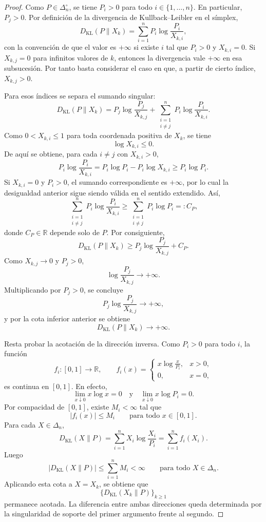 ﻿\documentclass[12pt]{article}
\begin{document}
\begin{proof}
Como \(P\in\Delta_n^\circ\), se tiene \(P_i>0\) para todo \(i\in\{1,\ldots,n\}\). En particular, \(P_j>0\). Por definición de la divergencia de Kullback--Leibler en el símplex,
\[
D_{\mathrm{KL}}(P\|X_k)
=
\sum_{i=1}^n P_i\log\frac{P_i}{X_{k,i}},
\]
con la convención de que el valor es \(+\infty\) si existe \(i\) tal que \(P_i>0\) y \(X_{k,i}=0\). Si \(X_{k,j}=0\) para infinitos valores de \(k\), entonces la divergencia vale \(+\infty\) en esa subsucesión. Por tanto basta considerar el caso en que, a partir de cierto índice, \(X_{k,j}>0\).

Para esos índices se separa el sumando singular:
\[
D_{\mathrm{KL}}(P\|X_k)
=
P_j\log\frac{P_j}{X_{k,j}}
+
\sum_{\substack{i=1\\ i\ne j}}^n
P_i\log\frac{P_i}{X_{k,i}}.
\]
Como \(0<X_{k,i}\le 1\) para toda coordenada positiva de \(X_k\), se tiene
\[
\log X_{k,i}\le 0.
\]
De aquí se obtiene, para cada \(i\ne j\) con \(X_{k,i}>0\),
\[
P_i\log\frac{P_i}{X_{k,i}}
=
P_i\log P_i-P_i\log X_{k,i}
\ge
P_i\log P_i.
\]
Si \(X_{k,i}=0\) y \(P_i>0\), el sumando correspondiente es \(+\infty\), por lo cual la desigualdad anterior sigue siendo válida en el sentido extendido. Así,
\[
\sum_{\substack{i=1\\ i\ne j}}^n
P_i\log\frac{P_i}{X_{k,i}}
\ge
\sum_{\substack{i=1\\ i\ne j}}^n
P_i\log P_i
=:C_P,
\]
donde \(C_P\in\mathbb R\) depende solo de \(P\). Por consiguiente,
\[
D_{\mathrm{KL}}(P\|X_k)
\ge
P_j\log\frac{P_j}{X_{k,j}}+C_P.
\]
Como \(X_{k,j}\to0\) y \(P_j>0\),
\[
\log\frac{P_j}{X_{k,j}}\longrightarrow+\infty.
\]
Multiplicando por \(P_j>0\), se concluye
\[
P_j\log\frac{P_j}{X_{k,j}}\longrightarrow+\infty,
\]
y por la cota inferior anterior se obtiene
\[
D_{\mathrm{KL}}(P\|X_k)\longrightarrow+\infty.
\]

Resta probar la acotación de la dirección inversa. Como \(P_i>0\) para todo \(i\), la función
\[
f_i:[0,1]\longrightarrow\mathbb R,
\qquad
f_i(x)=
\begin{cases}
x\log\frac{x}{P_i}, & x>0,\\
0, & x=0,
\end{cases}
\]
es continua en \([0,1]\). En efecto,
\[
\lim_{x\downarrow0}x\log x=0
\quad\text{y}\quad
\lim_{x\downarrow0}x\log P_i=0.
\]
Por compacidad de \([0,1]\), existe \(M_i<\infty\) tal que
\[
|f_i(x)|\le M_i
\qquad
\text{para todo }x\in[0,1].
\]
Para cada \(X\in\Delta_n\),
\[
D_{\mathrm{KL}}(X\|P)
=
\sum_{i=1}^n
X_i\log\frac{X_i}{P_i}
=
\sum_{i=1}^n f_i(X_i).
\]
Luego
\[
\left|D_{\mathrm{KL}}(X\|P)\right|
\le
\sum_{i=1}^n M_i
<\infty
\qquad
\text{para todo }X\in\Delta_n.
\]
Aplicando esta cota a \(X=X_k\), se obtiene que
\[
\{D_{\mathrm{KL}}(X_k\|P)\}_{k\ge1}
\]
permanece acotada. La diferencia entre ambas direcciones queda determinada por la singularidad de soporte del primer argumento frente al segundo.
\end{proof}
\end{document}

